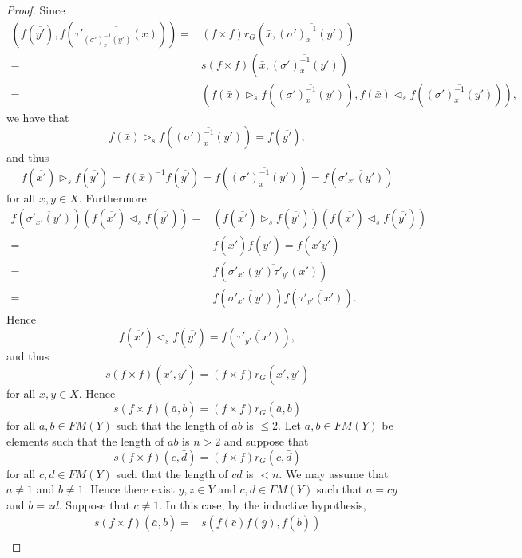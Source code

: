 \begin{proof}
Since 
\begin{align*}
\left(f\left(\overline{y'}\right),f\left(\overline{\tau'_{(\sigma')^{-1}_x(y')}(x)}\right)\right)=&(f\times f)r_G\left( \bar x,\overline{(\sigma')^{-1}_x(y')}\right)\\
=&s(f\times f)\left(\bar x,\overline{(\sigma')^{-1}_x(y')}\right)\\
=&\left(f(\bar x)\rhd_s f\left(\overline{(\sigma')^{-1}_x(y')}\right),f(\bar x)\lhd_s f\left(\overline{(\sigma')^{-1}_x(y')}\right)\right),
\end{align*}
we have that
\[ f(\bar x)\rhd_s f\left(\overline{(\sigma')^{-1}_x(y')}\right)
=f\left(\overline{y'}\right),\]
and thus 
\[f\left(\overline{x'}\right)\rhd_s f\left(\overline{y'}\right)=f(\bar x)^{-1}f\left(\overline{y'}\right)=f\left(\overline{(\sigma')^{-1}_x(y')}\right)=f\left(\overline{\sigma'_{x'}(y')}\right)\]
for all $x,y\in X$. Furthermore
\begin{align*}
    f\left(\overline{\sigma'_{x'}(y')}\right)\left(f\left(\overline{x'}\right)\lhd_s f\left(\overline{y'}\right)\right)=&
    \left( f\left(\overline{x'}\right)\rhd_s f\left(\overline{y'}\right)\right)\left(f\left(\overline{x'}\right)\lhd_s f\left(\overline{y'}\right)\right)\\
    =&f\left(\overline{x'}\right)f\left(\overline{y'}\right)=f\left(\overline{x'y'}\right)\\
    =&f\left(\overline{\sigma'_{x'}(y')\tau'_{y'}(x')}\right)\\
    =&f\left(\overline{\sigma'_{x'}(y')}\right)f\left(\overline{\tau'_{y'}(x')}\right).
\end{align*}
Hence
\[f\left(\overline{x'}\right)\lhd_s f\left(\overline{y'} \right)=f\left(\overline{\tau'_{y'}(x')}\right),\]
and thus
\[s(f\times f)\left(\overline{x'},\overline{y'}\right)=(f\times f)r_G\left(\overline{x'},\overline{y'}\right)\]
for all $x,y\in X$.
Hence 
\[s(f\times f)\left(\bar a,\bar b\right)=(f\times f)r_G\left(\bar a,\bar b\right)\]
for all $a,b\in FM(Y)$ such that the length of $ab$ is $\leq 2$. Let $a,b\in FM(Y)$ be elements such that the length of $ab$ is $n>2$ and suppose that
\[s(f\times f)\left(\bar c,\bar d\right)=(f\times f)r_G\left(\bar c,\bar d\right)\]
for all $c,d\in FM(Y)$ such that the length of $cd$ is $<n$. We may assume that $a\neq 1$ and $b\neq 1$. Hence there exist $y,z\in Y$ and $c,d\in FM(Y)$ such that $a=cy$ and $b=zd$. Suppose that $c\neq 1$. In this case, by the inductive hypothesis,
\begin{align*}
    s(f\times f)(\bar a,\bar b)=&s(f(\bar c)f(\bar y),f(\bar b))\\

\end{align*}
\end{proof}
